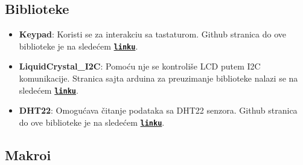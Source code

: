 \documentclass[a4paper, 12pt]{article}
\begin{document}
	\subsection{Biblioteke}
	\begin{itemize}
    		\item \textbf{Keypad}: Koristi se za interakciu sa tastaturom. Github stranica do ove biblioteke je na sledećem \textbf{\texttt{\href{https://github.com/Chris--A/Keypad.git}{linku}}}.
    		
    		\item \textbf{LiquidCrystal\_I2C}: Pomoću nje se kontroliše LCD putem I2C komunikacije. Stranica sajta arduina za preuzimanje biblioteke nalazi se na sledećem \textbf{\texttt{\href{https://downloads.arduino.cc/libraries/github.com/marcoschwartz/LiquidCrystal_I2C-1.1.2.zip}{linku}}}. 
    		
    		\item \textbf{DHT22}: Omogućava čitanje podataka sa DHT22 senzora. Github stranica do ove biblioteke je na sledećem \textbf{\texttt{\href{https://github.com/Chris--A/Keypad.git}{linku}}}.
	\end{itemize}

\newpage

	\subsection{Makroi}


\vspace{10pt}
\end{document}
